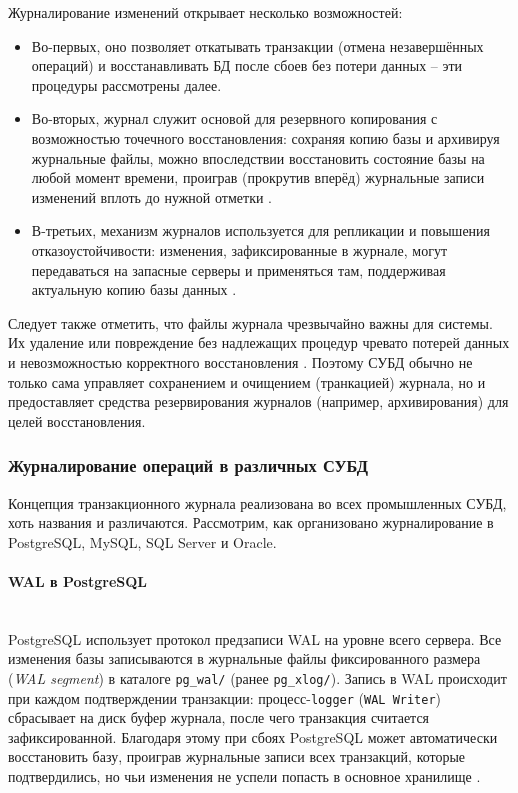  Журналирование изменений открывает несколько возможностей:
 \begin{itemize}
    \item Во-первых, оно позволяет откатывать транзакции (отмена незавершённых операций) и восстанавливать БД после сбоев без потери данных – эти процедуры рассмотрены далее. 
    \item Во-вторых, журнал служит основой для резервного копирования с возможностью точечного восстановления: сохраняя копию базы и архивируя журнальные файлы, можно впоследствии восстановить состояние базы на любой момент времени, проиграв (прокрутив вперёд) журнальные записи изменений вплоть до нужной отметки \autocite{PostgreSQLdocc28}. 
    \item В-третьих, механизм журналов используется для репликации и повышения отказоустойчивости: изменения, зафиксированные в журнале, могут передаваться на запасные серверы и применяться там, поддерживая актуальную копию базы данных \autocite{Mysqldoc7}. 
 \end{itemize}
 Следует также отметить, что файлы журнала чрезвычайно важны для системы. Их удаление или повреждение без надлежащих процедур чревато потерей данных и невозможностью корректного восстановления \autocite{MicrosoftLearnSQLserverTransLog}. Поэтому СУБД обычно не только сама управляет сохранением и очищением (транкацией) журнала, но и предоставляет средства резервирования журналов (например, архивирования) для целей восстановления.

\subsubsection{Журналирование операций в различных СУБД} 

 Концепция транзакционного журнала реализована во всех промышленных СУБД, хоть названия и различаются. Рассмотрим, как организовано журналирование в PostgreSQL, MySQL, SQL Server и Oracle. 

 \paragraph{WAL в PostgreSQL} ~\\

 PostgreSQL использует протокол предзаписи WAL на уровне всего сервера. Все изменения базы записываются в журнальные файлы фиксированного размера (\textit{WAL segment}) в каталоге \texttt{pg\_wal/} (ранее \texttt{pg\_xlog/}). Запись в WAL происходит при каждом подтверждении транзакции: процесс-\texttt{logger} (\texttt{WAL Writer}) сбрасывает на диск буфер журнала, после чего транзакция считается зафиксированной. Благодаря этому при сбоях PostgreSQL может автоматически восстановить базу, проиграв журнальные записи всех транзакций, которые подтвердились, но чьи изменения не успели попасть в основное хранилище \autocite{PostgreSQLdocc28}. 
 
